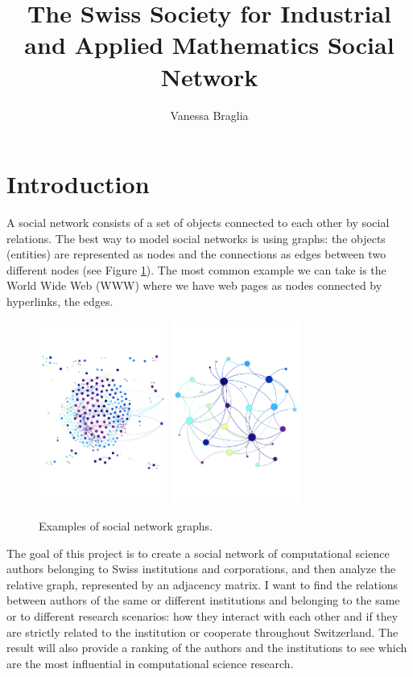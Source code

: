 \documentclass[]{usiinfbachelorproject}
\author{Vanessa Braglia}
\title{The Swiss Society for Industrial and Applied Mathematics Social Network}
\begin{document}
\maketitle
\newpage
\tableofcontents
\newpage

\section{Introduction} \label{sec:intro} 

A social network consists of a set of objects connected to each other by social relations. The best way to model social networks is using graphs: the objects (entities) are represented as nodes and the connections as edges between two different nodes (see Figure \ref{fig:socialnetwork}). The most common example we can take is the World Wide Web (WWW) where we have web pages as nodes connected by hyperlinks, the edges.

\begin{figure}[ht]
	\centering
	\includegraphics[height=6cm]{img/graph_auth.pdf}
	\qquad\qquad
	\includegraphics[height=6cm]{img/graph_uni.pdf}
	\caption{Examples of social network graphs.}
	\label{fig:socialnetwork}
\end{figure}

The goal of this project is to create a social network of computational science authors belonging to Swiss institutions and corporations, and then analyze the relative graph, represented by an adjacency matrix. I want to find the relations between authors of the same or different institutions and belonging to the same or to different research scenarios: how they interact with each other and if they are strictly related to the institution or cooperate throughout Switzerland. The result will also provide a ranking of the authors and the institutions to see which are the most influential in computational science research.
\end{document}
